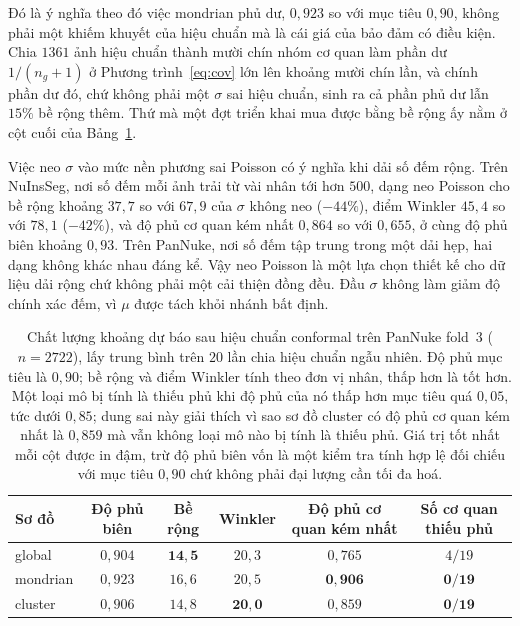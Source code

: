 \documentclass[preprint,12pt]{elsarticle}
\begin{document}
Đó là ý nghĩa theo đó việc mondrian phủ dư, $0{,}923$ so với mục tiêu $0{,}90$, không phải một khiếm khuyết của
hiệu chuẩn mà là cái giá của bảo đảm có điều kiện. Chia $1361$ ảnh hiệu chuẩn thành mười chín nhóm cơ quan làm
phần dư $1/(n_g+1)$ ở Phương trình~\eqref{eq:cov} lớn lên khoảng mười chín lần, và chính phần dư đó, chứ không
phải một $\sigma$ sai hiệu chuẩn, sinh ra cả phần phủ dư lẫn $15\%$ bề rộng thêm. Thứ mà một đợt triển khai mua
được bằng bề rộng ấy nằm ở cột cuối của Bảng~\ref{tab:uq}.

Việc neo $\sigma$ vào mức nền phương sai Poisson có ý nghĩa khi dải số đếm rộng. Trên NuInsSeg, nơi số đếm mỗi ảnh
trải từ vài nhân tới hơn $500$, dạng neo Poisson cho bề rộng khoảng $37{,}7$ so với $67{,}9$ của $\sigma$ không
neo ($-44\%$), điểm Winkler $45{,}4$ so với $78{,}1$ ($-42\%$), và độ phủ cơ quan kém nhất $0{,}864$ so với
$0{,}655$, ở cùng độ phủ biên khoảng $0{,}93$. Trên PanNuke, nơi số đếm tập trung trong một dải hẹp, hai dạng
không khác nhau đáng kể. Vậy neo Poisson là một lựa chọn thiết kế cho dữ liệu dải rộng chứ không phải một cải
thiện đồng đều. Đầu $\sigma$ không làm giảm độ chính xác đếm, vì $\mu$ được tách khỏi nhánh bất định.

\begin{table}[!htbp]
\centering
\caption{Chất lượng khoảng dự báo sau hiệu chuẩn conformal trên PanNuke fold~3 ($n=2722$), lấy trung bình trên
$20$ lần chia hiệu chuẩn ngẫu nhiên. Độ phủ mục tiêu là $0{,}90$; bề rộng và điểm Winkler tính theo đơn vị nhân,
thấp hơn là tốt hơn. Một loại mô bị tính là thiếu phủ khi độ phủ của nó thấp hơn mục tiêu quá $0{,}05$, tức dưới
$0{,}85$; dung sai này giải thích vì sao sơ đồ cluster có độ phủ cơ quan kém nhất là $0{,}859$ mà vẫn không loại
mô nào bị tính là thiếu phủ. Giá trị tốt nhất mỗi cột được in đậm, trừ độ phủ biên vốn là một kiểm tra tính hợp lệ
đối chiếu với mục tiêu $0{,}90$ chứ không phải đại lượng cần tối đa hoá.}\label{tab:uq}
\footnotesize
\setlength{\tabcolsep}{5pt}
\begin{tabular}{@{}lccccc@{}}
\toprule
Sơ đồ & Độ phủ biên & Bề rộng & Winkler & Độ phủ cơ quan kém nhất & Số cơ quan thiếu phủ \\
\midrule
global & $0{,}904$ & $\mathbf{14{,}5}$ & $20{,}3$ & $0{,}765$ & $4/19$ \\
mondrian & $0{,}923$ & $16{,}6$ & $20{,}5$ & $\mathbf{0{,}906}$ & $\mathbf{0/19}$ \\
cluster & $0{,}906$ & $14{,}8$ & $\mathbf{20{,}0}$ & $0{,}859$ & $\mathbf{0/19}$ \\
\bottomrule
\end{tabular}
\end{table}
\end{document}
